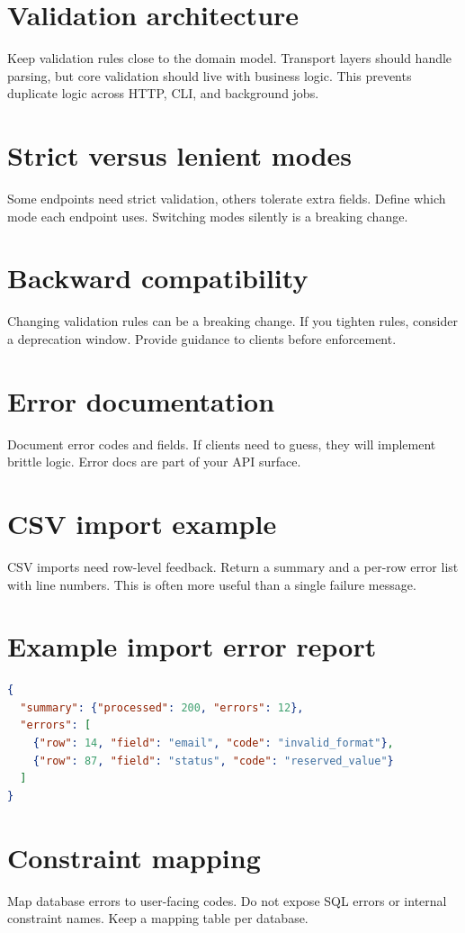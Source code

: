 \section{Validation architecture}
Keep validation rules close to the domain model.
Transport layers should handle parsing, but core validation should live with business logic.
This prevents duplicate logic across HTTP, CLI, and background jobs.

\section{Strict versus lenient modes}
Some endpoints need strict validation, others tolerate extra fields.
Define which mode each endpoint uses.
Switching modes silently is a breaking change.

\section{Backward compatibility}
Changing validation rules can be a breaking change.
If you tighten rules, consider a deprecation window.
Provide guidance to clients before enforcement.

\section{Error documentation}
Document error codes and fields.
If clients need to guess, they will implement brittle logic.
Error docs are part of your API surface.

\section{CSV import example}
CSV imports need row-level feedback.
Return a summary and a per-row error list with line numbers.
This is often more useful than a single failure message.

\section{Example import error report}
\begin{lstlisting}[language=JSON]
{
  "summary": {"processed": 200, "errors": 12},
  "errors": [
    {"row": 14, "field": "email", "code": "invalid_format"},
    {"row": 87, "field": "status", "code": "reserved_value"}
  ]
}
\end{lstlisting}

\section{Constraint mapping}
Map database errors to user-facing codes.
Do not expose SQL errors or internal constraint names.
Keep a mapping table per database.

